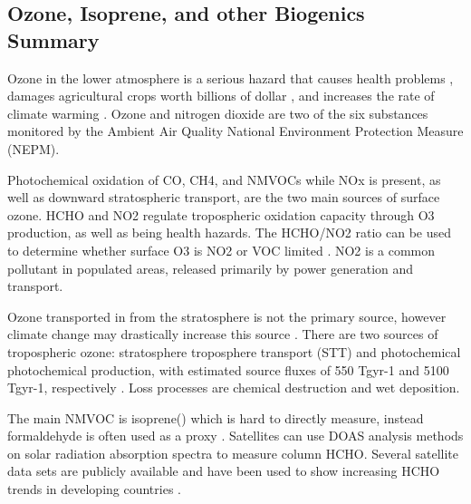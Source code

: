 \subsection{Ozone, Isoprene, and other Biogenics Summary}
Ozone in the lower atmosphere is a serious hazard that causes health problems \cite{Hsieh_2013}, damages agricultural crops worth billions of dollar \cite{Avnery_2011}, and increases the rate of climate warming \cite{IPCC_2013_chap8}. 
Ozone and nitrogen dioxide are two of the six substances monitored by the Ambient Air Quality National Environment Protection Measure (NEPM). 
  
Photochemical oxidation of CO, CH4, and NMVOCs while NOx is present, as well as downward stratospheric transport, are the two main sources of surface ozone.
HCHO and NO2 regulate tropospheric oxidation capacity through O3 production, as well as being health hazards.
The HCHO/NO2 ratio can be used to determine whether surface O3 is NO2 or VOC limited \cite{Mahajan_2015}.
NO2 is a common pollutant in populated areas, released primarily by power generation and transport.

Ozone transported in from the stratosphere is not the primary source, however climate change may drastically increase this source \cite{Hegglin_2009}.
There are two sources of tropospheric ozone: stratosphere troposphere transport (STT) and photochemical photochemical production, with estimated source fluxes of 550 Tgyr-1 and 5100 Tgyr-1, respectively \cite{Stevenson_2006}. 
Loss processes are chemical destruction and wet deposition.

The main NMVOC is isoprene(\cite{Guenther_2006}) which is hard to directly measure, instead formaldehyde is often used as a proxy \cite{Marais_2012,bauwens2013satellite}. 
Satellites can use DOAS analysis methods on solar radiation absorption spectra to measure column HCHO.
Several satellite data sets are publicly available and have been used to show increasing HCHO trends in developing countries \cite{Mahajan_2015}.
  
  
  